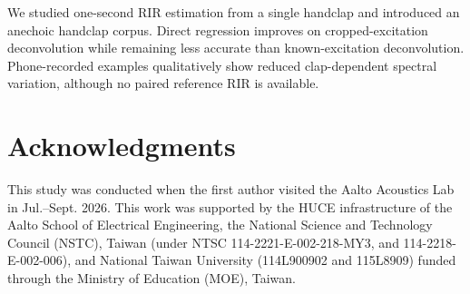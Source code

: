 \documentclass{article}
\begin{document}

We studied one-second RIR estimation from a single handclap and introduced an
anechoic handclap corpus. Direct regression improves on cropped-excitation
deconvolution while remaining less accurate than known-excitation
deconvolution. Phone-recorded examples qualitatively show reduced
clap-dependent spectral variation, although no paired reference RIR is
available.

\section{Acknowledgments}
This study was conducted when the first author visited the Aalto Acoustics Lab in Jul.--Sept. 2026. This work was supported by the HUCE infrastructure of the Aalto School of Electrical Engineering, the National Science and Technology Council (NSTC), Taiwan (under NTSC 114-2221-E-002-218-MY3, and 114-2218-E-002-006), and National Taiwan University (114L900902 and 115L8909) funded through the Ministry of Education (MOE), Taiwan.







\end{document}
